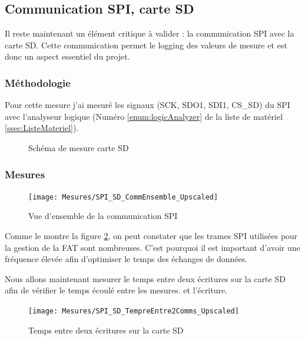 \subsection{Communication SPI, carte SD}
{
	Il reste maintenant un élément critique à valider : la communication SPI avec la carte SD. Cette communication permet le logging des valeurs de mesure et est donc un aspect essentiel du projet.
	\subsubsection{Méthodologie}
	Pour cette mesure j'ai mesuré les signaux (SCK, SDO1, SDI1, CS\_SD) du SPI avec l'analyseur logique (Numéro \ref{enum:logicAnalyzer} de la liste de matériel \ref{ssec:ListeMateriel}).
	
	\begin{figure}[h]
		\centering
		\caption{Schéma de mesure carte SD}
		\label{fig:schspisd}
	\end{figure}
		
	\subsubsection{Mesures}
	\begin{figure}[h]
		\centering
		\texttt{[image: Mesures/SPI\_SD\_CommEnsemble\_Upscaled]}
		\caption{Vue d'ensemble de la communication SPI}
		\label{fig:spisdcommensembleupscaled}
	\end{figure}
	Comme le montre la figure \ref{fig:spisdcommensembleupscaled}, on peut constater que les trames SPI utilisées pour la gestion de la FAT sont nombreuses. C'est pourquoi il est important d'avoir une fréquence élevée afin d'optimiser le temps des échanges de données.
	
	Nous allons maintenant mesurer le temps entre deux écritures sur la carte SD afin de vérifier le temps écoulé entre les mesures. et l'écriture.
	
	\clearpage
	
	\begin{figure}[h]
		\centering
		\texttt{[image: Mesures/SPI\_SD\_TempreEntre2Comms\_Upscaled]}
		\caption{Temps entre deux écritures sur la carte SD}
		\label{fig:spisdtempreentre2commsupscaled}
	\end{figure}
	
}
